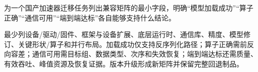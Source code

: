 \begin{exercises}
\begin{exercise}\optional 为一个国产加速器迁移任务列出兼容矩阵的最小字段，明确“模型加载成功”“算子正确”“通信可用”“端到端达标”各自能够支持什么结论。

\begin{solution}
最少列设备/驱动/固件、框架与设备扩展、底层运行时、通信库、精度、模型修订、关键形状/算子和并行布局。加载成功仅支持反序列化路径；算子正确需前反向容差；通信可用需目标组、数据类型、次序和失效恢复；端到端达标还需质量、有效吞吐、峰值资源及恢复证据。版本升级形成新矩阵并保留完整回退制品。
\end{solution}
\end{exercise}

\end{exercises}
